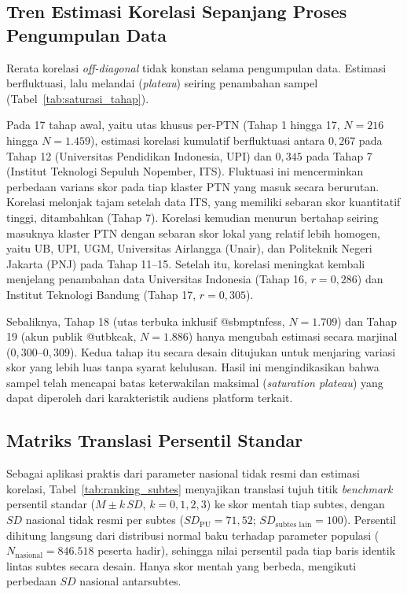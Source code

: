 \subsection{Tren Estimasi Korelasi Sepanjang Proses Pengumpulan Data}
Rerata korelasi \textit{off-diagonal} tidak konstan selama pengumpulan data. Estimasi berfluktuasi, lalu melandai (\textit{plateau}) seiring penambahan sampel (Tabel~\ref{tab:saturasi_tahap}).



Pada 17 tahap awal, yaitu utas khusus per-PTN (Tahap 1 hingga 17, $N = 216$ hingga $N = 1.459$), estimasi korelasi kumulatif berfluktuasi antara $0,267$ pada Tahap 12 (Universitas Pendidikan Indonesia, UPI) dan $0,345$ pada Tahap 7 (Institut Teknologi Sepuluh Nopember, ITS). Fluktuasi ini mencerminkan perbedaan varians skor pada tiap klaster PTN yang masuk secara berurutan. Korelasi melonjak tajam setelah data ITS, yang memiliki sebaran skor kuantitatif tinggi, ditambahkan (Tahap 7). Korelasi kemudian menurun bertahap seiring masuknya klaster PTN dengan sebaran skor lokal yang relatif lebih homogen, yaitu UB, UPI, UGM, Universitas Airlangga (Unair), dan Politeknik Negeri Jakarta (PNJ) pada Tahap 11--15. Setelah itu, korelasi meningkat kembali menjelang penambahan data Universitas Indonesia (Tahap 16, $r = 0,286$) dan Institut Teknologi Bandung (Tahap 17, $r = 0,305$).

Sebaliknya, Tahap 18 (utas terbuka inklusif @sbmptnfess, $N = 1.709$) dan Tahap 19 (akun publik @utbkcak, $N = 1.886$) hanya mengubah estimasi secara marjinal ($0,300$--$0,309$). Kedua tahap itu secara desain ditujukan untuk menjaring variasi skor yang lebih luas tanpa syarat kelulusan. Hasil ini mengindikasikan bahwa sampel telah mencapai batas keterwakilan maksimal (\textit{saturation plateau}) yang dapat diperoleh dari karakteristik audiens platform terkait.

\subsection{Matriks Translasi Persentil Standar}
Sebagai aplikasi praktis dari parameter nasional tidak resmi dan estimasi korelasi, Tabel~\ref{tab:ranking_subtes} menyajikan translasi tujuh titik \textit{benchmark} persentil standar ($M \pm k\,SD$, $k = 0, 1, 2, 3$) ke skor mentah tiap subtes, dengan $SD$ nasional tidak resmi per subtes ($SD_{\text{PU}} = 71,52$; $SD_{\text{subtes lain}} = 100$). Persentil dihitung langsung dari distribusi normal baku terhadap parameter populasi ($N_{\text{nasional}} = 846.518$ peserta hadir), sehingga nilai persentil pada tiap baris identik lintas subtes secara desain. Hanya skor mentah yang berbeda, mengikuti perbedaan $SD$ nasional antarsubtes.

